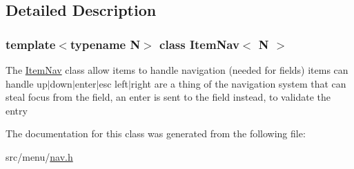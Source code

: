 \subsection{Detailed Description}
\subsubsection*{template$<$typename N$>$\newline
class Item\+Nav$<$ N $>$}

The \hyperlink{classItemNav}{Item\+Nav} class allow items to handle navigation (needed for fields) items can handle up$\vert$down$\vert$enter$\vert$esc left$\vert$right are a thing of the navigation system that can steal focus from the field, an enter is sent to the field instead, to validate the entry 

The documentation for this class was generated from the following file\+:\begin{DoxyCompactItemize}
\item 
src/menu/\hyperlink{nav_8h}{nav.\+h}\end{DoxyCompactItemize}
